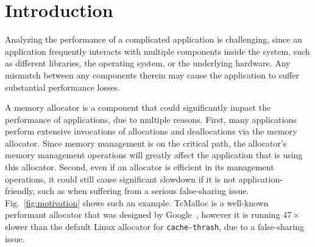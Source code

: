 

\section{Introduction}

Analyzing the performance of a complicated application is challenging, since an application frequently interacts with multiple components inside the system, such as different libraries, the operating system, or the underlying hardware. Any mismatch between any components therein may cause the application to suffer substantial performance losses.

A memory allocator is a component that could significantly impact the performance of applications, due to multiple reasons. First, many applications perform extensive invocations of allocations and deallocations via the memory allocator. Since memory management is on the critical path, the allocator's memory management operations will greatly affect the application that is using this allocator.
Second, even if an allocator is efficient in its management operations, it could still cause significant slowdown if it is not application-friendly, such as when suffering from a serious false-sharing issue. Fig.~\ref{fig:motivation} shows such an example. TcMalloc is a well-known performant allocator that was designed by Google~\cite{tcmalloc}, however it is running $47\times$ slower than the default Linux allocator for \texttt{cache-thrash}, due to a false-sharing issue. 



